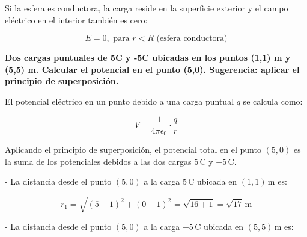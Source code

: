 \documentclass[12pt, answers]{exam} %
\begin{document}
\begin{questions}
        Si la esfera es conductora, la carga reside en la superficie exterior y el campo eléctrico en el interior también es cero:
        
        \[
        E = 0, \text{ para } r < R \text{ (esfera conductora)}
        \]
        
        
     \begin{center}
     \end{center}
        

    \question \large\textbf{Dos cargas puntuales de 5C y -5C ubicadas en los puntos (1,1) m y (5,5) m. Calcular el potencial en el punto (5,0). Sugerencia: aplicar el principio de superposición.}

   
        El potencial eléctrico en un punto debido a una carga puntual \( q \) se calcula como:
        
        \[
        V = \frac{1}{4 \pi \epsilon_0} \cdot \frac{q}{r}
        \]
        
        Aplicando el principio de superposición, el potencial total en el punto \( (5,0) \) es la suma de los potenciales debidos a las dos cargas \( 5 \, \text{C} \) y \( -5 \, \text{C} \).
        
        - La distancia desde el punto \( (5,0) \) a la carga \( 5 \, \text{C} \) ubicada en \( (1,1) \, \text{m} \) es:
        
        \[
        r_1 = \sqrt{(5-1)^2 + (0-1)^2} = \sqrt{16 + 1} = \sqrt{17} \, \text{m}
        \]
        
        - La distancia desde el punto \( (5,0) \) a la carga \( -5 \, \text{C} \) ubicada en \( (5,5) \, \text{m} \) es:
        

\end{questions}
\end{document}
